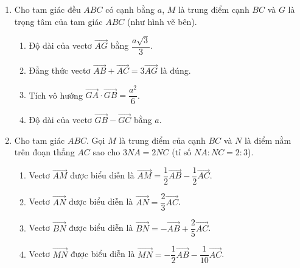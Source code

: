 \documentclass[10pt,a4paper]{article}
\begin{document}
\begin{enumerate}
\item Cho tam giác đều $ABC$ có cạnh bằng $a$, $M$ là trung điểm cạnh $BC$ và $G$ là trọng tâm của tam giác $ABC$ (như hình vẽ bên).
\par\noindent\begin{minipage}[t]{0.72\linewidth}
\begin{enumerate}
    \item Độ dài của vectơ $\vec{AG}$ bằng $\dfrac{a\sqrt{3}}{3}$.
    \item Đẳng thức vectơ $\vec{AB} + \vec{AC} = 3\vec{AG}$ là đúng.
    \item Tích vô hướng $\vec{GA} \cdot \vec{GB} = \dfrac{a^2}{6}$.
    \item Độ dài của vectơ $\vec{GB} - \vec{GC}$ bằng $a$.
\end{enumerate}
\end{minipage}\hfill
\begin{minipage}[t]{0.26\linewidth}\raggedleft\vspace{-6pt}
\end{minipage}

\item Cho tam giác $ABC$. Gọi $M$ là trung điểm của cạnh $BC$ và $N$ là điểm nằm trên đoạn thẳng $AC$ sao cho $3NA = 2NC$ (tỉ số $NA : NC = 2 : 3$).
\begin{enumerate}
    \item Vectơ $\vec{AM}$ được biểu diễn là $\vec{AM} = \dfrac{1}{2}\vec{AB} - \dfrac{1}{2}\vec{AC}$.
    \item Vectơ $\vec{AN}$ được biểu diễn là $\vec{AN} = \dfrac{2}{3}\vec{AC}$.
    \item Vectơ $\vec{BN}$ được biểu diễn là $\vec{BN} = -\vec{AB} + \dfrac{2}{5}\vec{AC}$.
    \item Vectơ $\vec{MN}$ được biểu diễn là $\vec{MN} = -\dfrac{1}{2}\vec{AB} - \dfrac{1}{10}\vec{AC}$.
\end{enumerate}


\end{enumerate}
\end{document}
